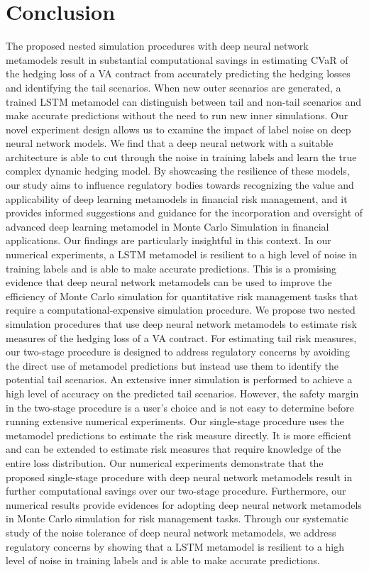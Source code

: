 \documentclass{article}
\begin{document}
\section{Conclusion} \label{sec:conclusion}
The proposed nested simulation procedures with deep neural network metamodels result in substantial computational savings in estimating CVaR of the hedging loss of a VA contract from accurately predicting the hedging losses and identifying the tail scenarios.
When new outer scenarios are generated, a trained LSTM metamodel can distinguish between tail and non-tail scenarios and make accurate predictions without the need to run new inner simulations.
Our novel experiment design allows us to examine the impact of label noise on deep neural network models.
We find that a deep neural network with a suitable architecture is able to cut through the noise in training labels and learn the true complex dynamic hedging model.
By showcasing the resilience of these models, our study aims to influence regulatory bodies towards recognizing the value and applicability of deep learning metamodels in financial risk management, and it provides informed suggestions and guidance for the incorporation and oversight of advanced deep learning metamodel in Monte Carlo Simulation in financial applications.
Our findings are particularly insightful in this context.
In our numerical experiments, a LSTM metamodel is resilient to a high level of noise in training labels and is able to make accurate predictions. 
This is a promising evidence that deep neural network metamodels can be used to improve the efficiency of Monte Carlo simulation for quantitative risk management tasks that require a computational-expensive simulation procedure.
We propose two nested simulation procedures that use deep neural network metamodels to estimate risk measures of the hedging loss of a VA contract.
For estimating tail risk measures, our two-stage procedure is designed to address regulatory concerns by avoiding the direct use of metamodel predictions but instead use them to identify the potential tail scenarios.
An extensive inner simulation is performed to achieve a high level of accuracy on the predicted tail scenarios.
However, the safety margin in the two-stage procedure is a user's choice and is not easy to determine before running extensive numerical experiments.
Our single-stage procedure uses the metamodel predictions to estimate the risk measure directly.
It is more efficient and can be extended to estimate risk measures that require knowledge of the entire loss distribution.
Our numerical experiments demonstrate that the proposed single-stage procedure with deep neural network metamodels result in further computational savings over our two-stage procedure. 
Furthermore, our numerical results provide evidences for adopting deep neural network metamodels in Monte Carlo simulation for risk management tasks.
Through our systematic study of the noise tolerance of deep neural network metamodels, we address regulatory concerns by showing that a LSTM metamodel is resilient to a high level of noise in training labels and is able to make accurate predictions.



\newpage

\footnotesize

\end{document}
